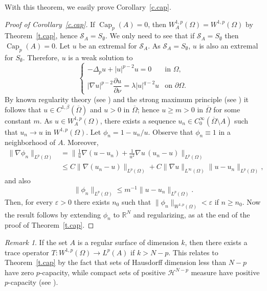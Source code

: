 \documentclass[11pt]{amsart}
\theoremstyle{remark}
\newtheorem{remark}{Remark}[section]
\numberwithin{equation}{section}
\newcommand{\R}{\mathbb{R}}
\newcommand{\cS}{\mathcal{S}}
\DeclareMathOperator{\capa}{Cap}
\begin{document}
With this theorem, we easily prove Corollary~\ref{c.cap}.

\begin{proof}[Proof of Corollary~\ref{c.cap}]
If $\capa_p(A)=0$, then $W^{1,p}_A(\Omega)=W^{1,p}(\Omega)$ by Theorem~\ref{t.cap}, hence $\cS_A=S_\emptyset$. We only need to see that if $\cS_A=S_\emptyset$ then $\capa_p(A)=0$. Let $u$ be an extremal for $\cS_A$. As $\cS_A=S_\emptyset$, $u$ is also an extremal for $S_\emptyset$. Therefore, $u$ is a weak solution to
\[
\begin{cases}
-\Delta_pu+|u|^{p-2}u=0 & \text{in }\Omega,\\[2pt]
|\nabla u|^{p-2}\dfrac{\partial u}{\partial\nu}=\lambda|u|^{q-2}u & \text{on }\partial\Omega.
\end{cases}
\]
By known regularity theory (see \cite{To}) and the strong maximum principle (see \cite{Va}) it follows that $u\in C^{1,\beta}(\overline\Omega)$ and $u>0$ in $\overline\Omega$; hence $u\ge m>0$ in $\overline\Omega$ for some constant $m$. As $u\in W^{1,p}_A(\Omega)$, there exists a sequence $u_n\in C^\infty_0(\overline\Omega\setminus A)$ such that $u_n\to u$ in $W^{1,p}(\Omega)$. Let $\phi_n=1-u_n/u$. Observe that $\phi_n\equiv1$ in a neighborhood of $A$. Moreover,
\begin{align*}
\|\nabla\phi_n\|_{L^p(\Omega)}&=\Big\|\frac1u\nabla(u-u_n)+\frac1{u^2}\nabla u\,(u_n-u)\Big\|_{L^p(\Omega)}\\
&\le C\|\nabla(u_n-u)\|_{L^p(\Omega)}+C\|\nabla u\|_{L^\infty(\Omega)}\|u-u_n\|_{L^p(\Omega)},
\end{align*}
and also
\[
\|\phi_n\|_{L^p(\Omega)}\le m^{-1}\|u-u_n\|_{L^p(\Omega)}.
\]
Then, for every $\varepsilon>0$ there exists $n_0$ such that $\|\phi_n\|_{W^{1,p}(\Omega)}<\varepsilon$ if $n\ge n_0$. Now the result follows by extending $\phi_n$ to $\R^N$ and regularizing, as at the end of the proof of Theorem~\ref{t.cap}.
\end{proof}

\begin{remark}\label{r.trace}
If the set $A$ is a regular surface of dimension $k$, then there exists a trace operator $T:W^{1,p}(\Omega)\to L^p(A)$ if $k>N-p$. This relates to Theorem~\ref{t.cap} by the fact that sets of Hausdorff dimension less than $N-p$ have zero $p$-capacity, while compact sets of positive $\mathcal{H}^{N-p}$ measure have positive $p$-capacity (see \cite{AH,EG}).
\end{remark}
\end{document}
